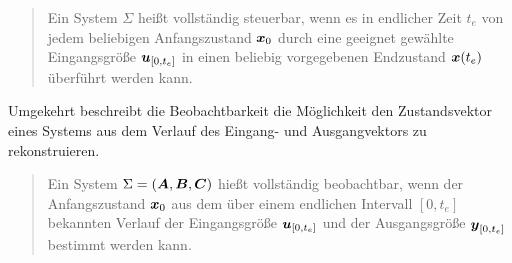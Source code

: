\begin{quote}
\glqq Ein System $\Sigma$ heißt vollständig steuerbar, wenn es in endlicher Zeit $t_e$ von jedem beliebigen Anfangszustand $\boldsymbol{x}_0$ durch eine geeignet gewählte Eingangsgröße $\boldsymbol{u}_{[0,t_e]}$ in einen beliebig vorgegebenen Endzustand $\boldsymbol{x}(t_e)$ überführt werden kann.\grqq
{}
\end{quote}

Umgekehrt beschreibt die Beobachtbarkeit die Möglichkeit den Zustandsvektor eines Systems aus dem Verlauf des Eingang- und Ausgangvektors zu rekonstruieren.

\begin{quote}
\glqq Ein System $\Sigma = (\boldsymbol{A},\boldsymbol{B},\boldsymbol{C})$ hießt vollständig beobachtbar, wenn der Anfangszustand $\boldsymbol{x}_0$ aus dem über einem endlichen Intervall $[0,t_e]$ bekannten Verlauf der Eingangsgröße $\boldsymbol{u}_{[0,t_e]}$ und der Ausgangsgröße $\boldsymbol{y}_{[0,t_e]}$ bestimmt werden kann.\grqq
{}
\end{quote}

